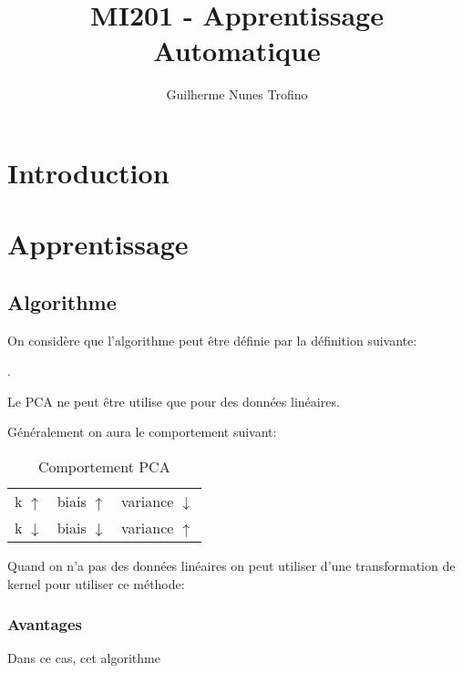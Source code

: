 \documentclass{article}
\title{MI201 - Apprentissage Automatique}
\author{Guilherme Nunes Trofino}
\begin{document}
\maketitle
\setlength{\parindent}{0pt}

\newpage\tableofcontents

\section{Introduction}

% 
% 

\section{Apprentissage}
\subsection{Algorithme}
On considère que l'algorithme peut être définie par la définition suivante:
\begin{definition}
    .
\end{definition}
\begin{remark}
    Le PCA ne peut être utilise que pour des données linéaires.
\end{remark}

Généralement on aura le comportement suivant:
\begin{table}[H]
    \centering\begin{tabular}{lll}
        k $\uparrow  $ & biais $\uparrow  $ & variance $\downarrow$\\
        k $\downarrow$ & biais $\downarrow$ & variance $\uparrow$\\
    \end{tabular}
    \caption{Comportement PCA}
\end{table}

Quand on n'a pas des données linéaires on peut utiliser d'une transformation de kernel pour utiliser ce méthode:
\begin{definition}
    
\end{definition} 
\subsubsection{Avantages}
Dans ce cas, cet algorithme 
\end{document}
